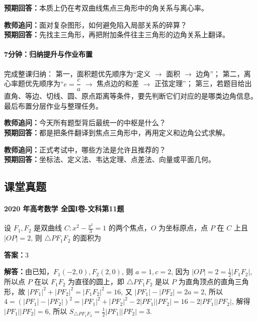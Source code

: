 \documentclass[UTF8,a4paper,11pt]{ctexart}
\begin{document}
\textbf{预期回答：}本质上仍在考双曲线焦点三角形中的角关系与离心率。\par

\noindent\textbf{教师追问：}面对复杂图形，如何避免陷入局部关系的碎算？\\

\textbf{预期回答：}先找主三角形，再把附加条件往主三角形的边角关系上翻译。\par

\paragraph{7分钟：归纳提升与作业布置}

完成整课归纳：
第一，面积题优先顺序为“定义 $\to$ 面积 $\to$ 边角”；
第二，离心率题优先顺序为“$e=\dfrac ca$ $\to$ 焦点边的和差 $\to$ 正弦定理”；
第三，若题目给出直角、等边、切线、圆、原点距离等条件，要先判断它们对应的是哪类边角信息。最后布置分层作业与整理任务。

\noindent\textbf{教师追问：}今天所有题型背后最统一的中枢是什么？\\

\textbf{预期回答：}都是把条件翻译到焦点三角形中，再用定义和边角公式求解。\par

\noindent\textbf{教师追问：}正式考试中，哪些方法是允许且推荐的？\\

\textbf{预期回答：}坐标法、定义法、韦达定理、点差法、向量或平面几何。\par

\subsection*{课堂真题}

\paragraph{2020 年高考数学 全国I卷-文科第11题}

设 $F_1, F_2$ 是双曲线 $C: x^2 - \frac{y^2}{3} = 1$ 的两个焦点，$O$ 为坐标原点，点 $P$ 在 $C$ 上且 $|OP| = 2$, 则 $\triangle PF_1F_2$ 的面积为

\textbf{答案：}$3$\par

\textbf{解答：}由已知，$F_1(-2,0), F_2(2,0)$, 则 $a=1, c=2$, 因为 $|OP|=2 = \frac{1}{2}|F_1F_2|$, 所以点 $P$ 在以 $F_1F_2$ 为直径的圆上，即 $\triangle PF_1F_2$ 是以 $P$ 为直角顶点的直角三角形，故 $|PF_1|^2 + |PF_2|^2 = |F_1F_2|^2 = 16$, 又 $|PF_1|-|PF_2|=2a=2$, 所以 $4 = (|PF_1|-|PF_2|)^2 = |PF_1|^2 + |PF_2|^2 - 2|PF_1||PF_2| = 16 - 2|PF_1||PF_2|$, 解得 $|PF_1||PF_2|=6$, 所以 $S_{\triangle PF_1F_2} = \frac{1}{2}|PF_1||PF_2|=3$.
\end{document}
